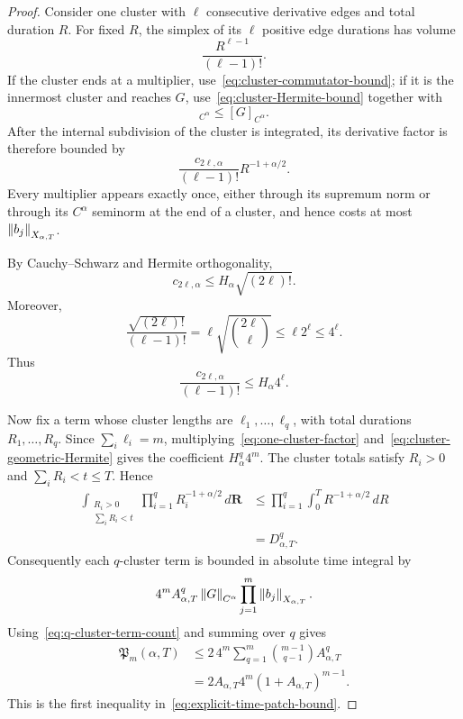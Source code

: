 \begin{proof}
Consider one cluster with $\ell$ consecutive derivative edges and total duration $R$. For fixed $R$, the simplex of its $\ell$ positive edge durations has volume
\begin{equation*}
  \frac{R^{\ell-1}}{(\ell-1)!}.
\end{equation*}
If the cluster ends at a multiplier, use~\eqref{eq:cluster-commutator-bound}; if it is the innermost cluster and reaches $G$, use~\eqref{eq:cluster-Hermite-bound} together with
\begin{equation*}
  [P_{s_1}G]_{C^\alpha}
  \leq
  [G]_{C^\alpha}.
\end{equation*}
After the internal subdivision of the cluster is integrated, its derivative factor is therefore bounded by
\begin{equation}
  \frac{c_{2\ell,\alpha}}{(\ell-1)!}
  R^{-1+\alpha/2}.
  \label{eq:one-cluster-factor}
\end{equation}
Every multiplier appears exactly once, either through its supremum norm or through its $C^\alpha$ seminorm at the end of a cluster, and hence costs at most $\left\lVert b_j\right\rVert_{X_{\alpha,T}}$.

By Cauchy--Schwarz and Hermite orthogonality,
\begin{equation*}
  c_{2\ell,\alpha}
  \leq
  H_\alpha\sqrt{(2\ell)!}.
\end{equation*}
Moreover,
\begin{equation*}
  \frac{\sqrt{(2\ell)!}}{(\ell-1)!}
  =
  \ell\sqrt{\binom{2\ell}{\ell}}
  \leq
  \ell2^\ell
  \leq
  4^\ell.
\end{equation*}
Thus
\begin{equation}
  \frac{c_{2\ell,\alpha}}{(\ell-1)!}
  \leq
  H_\alpha4^\ell.
  \label{eq:cluster-geometric-Hermite}
\end{equation}

Now fix a term whose cluster lengths are $\ell_1,\ldots,\ell_q$, with total durations $R_1,\ldots,R_q$. Since $\sum_i\ell_i=m$, multiplying~\eqref{eq:one-cluster-factor} and~\eqref{eq:cluster-geometric-Hermite} gives the coefficient $H_\alpha^q4^m$. The cluster totals satisfy $R_i>0$ and $\sum_iR_i<t\leq T$. Hence
\begin{align*}
  \int_{\substack{R_i>0\\\sum_iR_i<t}}
  \prod_{i=1}^qR_i^{-1+\alpha/2}
  \,d\mathbf R
  &\leq
  \prod_{i=1}^q
  \int_0^T R^{-1+\alpha/2}\,dR\\
  &=
  D_{\alpha,T}^q.
\end{align*}
Consequently each $q$-cluster term is bounded in absolute time integral by
\begin{equation*}
  4^mA_{\alpha,T}^q
  \left\lVert G\right\rVert_{C^\alpha}
  \prod_{j=1}^m\left\lVert b_j\right\rVert_{X_{\alpha,T}}.
\end{equation*}
Using~\eqref{eq:q-cluster-term-count} and summing over $q$ gives
\begin{align*}
  \mathfrak P_m(\alpha,T)
  &\leq
  2\,4^m
  \sum_{q=1}^m
  \binom{m-1}{q-1}A_{\alpha,T}^q\\
  &=
  2A_{\alpha,T}4^m
  (1+A_{\alpha,T})^{m-1}.
\end{align*}
This is the first inequality in~\eqref{eq:explicit-time-patch-bound}.


\end{proof}
